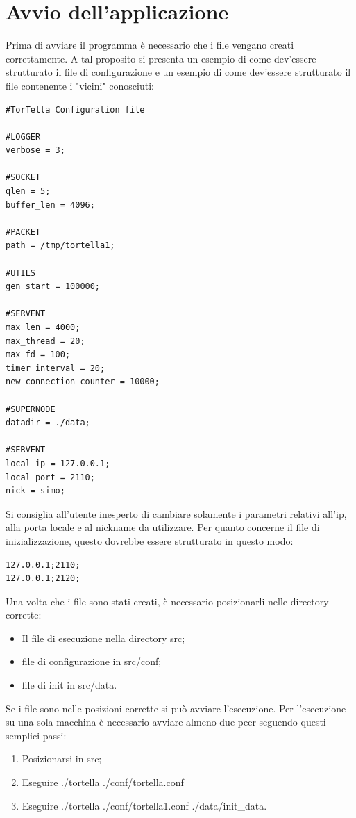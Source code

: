 \section{Avvio dell'applicazione}
Prima di avviare il programma è necessario che i file vengano creati correttamente. A tal proposito si presenta un esempio di come dev'essere strutturato il file di configurazione e un esempio di come dev'essere strutturato il file contenente i "vicini" conosciuti:
\begin{lstlisting}
#TorTella Configuration file

#LOGGER
verbose = 3;

#SOCKET
qlen = 5;
buffer_len = 4096;

#PACKET
path = /tmp/tortella1;

#UTILS
gen_start = 100000;

#SERVENT
max_len = 4000;
max_thread = 20;
max_fd = 100;
timer_interval = 20;
new_connection_counter = 10000;

#SUPERNODE
datadir = ./data;

#SERVENT
local_ip = 127.0.0.1;
local_port = 2110;
nick = simo;
\end{lstlisting}
Si consiglia all'utente inesperto di cambiare solamente i parametri relativi all'ip, alla porta locale e al nickname da utilizzare.
Per quanto concerne il file di inizializzazione, questo dovrebbe essere strutturato in questo modo:
\begin{lstlisting}
127.0.0.1;2110;
127.0.0.1;2120;
\end{lstlisting}
Una volta che i file sono stati creati, è necessario posizionarli nelle directory corrette:
\begin{itemize}
\item Il file di esecuzione nella directory src;
\item file di configurazione in src/conf; 
\item file di init in src/data.
\end{itemize}
Se i file sono nelle posizioni corrette si può avviare l'esecuzione. Per l'esecuzione su una sola macchina è necessario avviare almeno due peer seguendo questi semplici passi:
\begin{enumerate}
\item Posizionarsi in src;
\item Eseguire ./tortella ./conf/tortella.conf
\item Eseguire ./tortella ./conf/tortella1.conf ./data/init_data.  
\end{enumerate}
